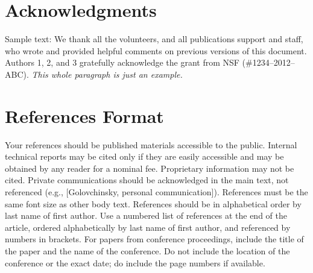 \documentclass{sigchi}
\begin{document}
\section{Acknowledgments}

Sample text: We thank all the volunteers, and all publications support
and staff, who wrote and provided helpful comments on previous
versions of this document. Authors 1, 2, and 3 gratefully acknowledge
the grant from NSF (\#1234--2012--ABC). \textit{This whole paragraph is
  just an example.}

%
%
%
%
%
\balance{}

\section{References Format}
Your references should be published materials accessible to the
public. Internal technical reports may be cited only if they are
easily accessible and may be obtained by any reader for a nominal
fee. Proprietary information may not be cited. Private communications
should be acknowledged in the main text, not referenced (e.g.,
[Golovchinsky, personal communication]). References must be the same
font size as other body text. References should be in alphabetical
order by last name of first author. Use a numbered list of references
at the end of the article, ordered alphabetically by last name of
first author, and referenced by numbers in brackets. For papers from
conference proceedings, include the title of the paper and the name of
the conference. Do not include the location of the conference or the
exact date; do include the page numbers if available. 
\end{document}
